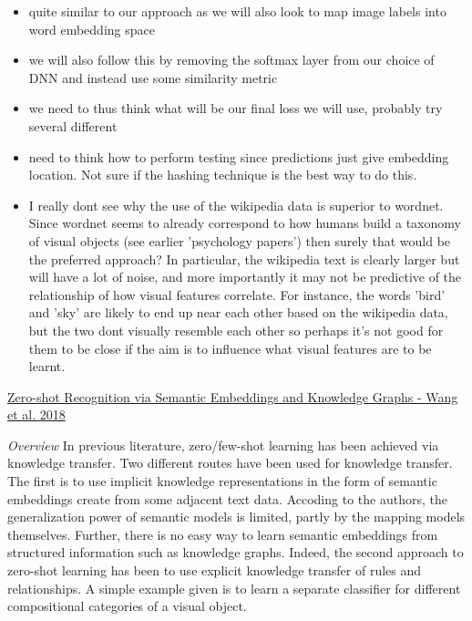 \documentclass[12pt]{report}
\begin{document}
\begin{itemize}
\item quite similar to our approach as we will also look to map image labels into word embedding space 
\item we will also follow this by removing the softmax layer from our choice of DNN and instead use some similarity metric
\item we need to thus think what will be our final loss we will use, probably try several different
\item need to think how to perform testing since predictions just give embedding location. Not sure if the hashing technique is the best way to do this. 
\item I really dont see why the use of the wikipedia data is superior to wordnet. Since wordnet seems to already correspond to how humans build a taxonomy of visual objects (see earlier 'psychology papers') then surely that would be the preferred approach? In particular, the wikipedia text is clearly larger but will have a lot of noise, and more importantly it may not be predictive of the relationship of how visual features correlate. For instance, the words 'bird' and 'sky' are likely to end up near each other based on the wikipedia data, but the two dont visually resemble each other so perhaps it's not good for them to be close if the aim is to influence what visual features are to be learnt. \\
\end{itemize}

\underline{Zero-shot Recognition via Semantic Embeddings and Knowledge Graphs - Wang et al. 2018}

\textit{Overview}
In previous literature, zero/few-shot learning has been achieved via knowledge transfer. Two different routes have been used for knowledge transfer. The first is to use implicit knowledge representations in the form of semantic embeddings create from some adjacent text data. Accoding to the authors, the generalization power of semantic models is limited, partly by the mapping models themselves. Further, there is no easy way to learn semantic embeddings from structured information such as knowledge graphs. Indeed, the second approach to zero-shot learning has been to use explicit knowledge transfer of rules and relationships. A simple example given is to learn a separate classifier for different compositional categories of a visual object.
\end{document}
